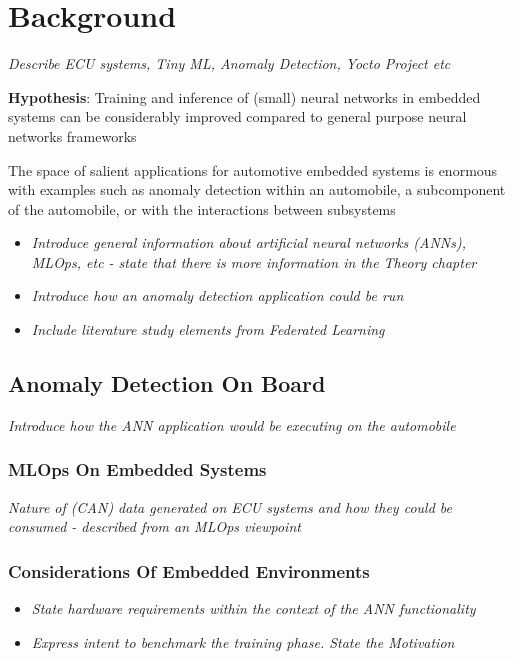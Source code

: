 \chapter{Background}
\textit{Describe ECU systems, Tiny ML, Anomaly Detection, Yocto Project etc}

\noindent \textbf{Hypothesis}: Training and inference of (small) neural networks in embedded systems can be considerably improved compared to general purpose neural networks frameworks

The space of salient applications for automotive embedded systems is enormous with examples such as anomaly detection within an automobile, a subcomponent of the automobile, or with the interactions between subsystems

\begin{itemize}
	\item \textit{Introduce general information about artificial neural networks (ANNs), MLOps, etc - state that there is more information in the Theory chapter}
	\item \textit{Introduce how an anomaly detection application could be run}
	\item \textit{Include literature study elements from Federated Learning}
\end{itemize}

\section[Anomaly Detection using Machine Learning]{Anomaly Detection On Board}
\textit{Introduce how the ANN application would be executing on the automobile}

\subsection[Machine Learning on Embedded Devices]{MLOps On Embedded Systems}
\textit{Nature of (CAN) data generated on ECU systems and how they could be consumed - described from an MLOps viewpoint }

\subsection[Considerations of Embedded Environments]{Considerations Of Embedded Environments}
\begin{itemize}
	\item \textit{State hardware requirements within the context of the ANN functionality}
	\item \textit{Express intent to benchmark the training phase. State the Motivation}
\end{itemize}


